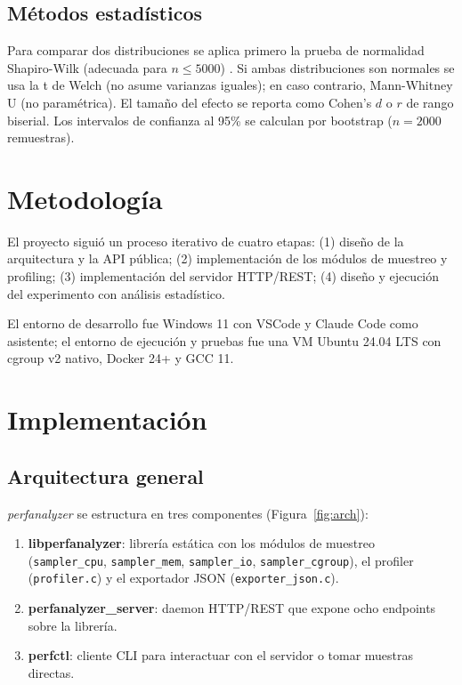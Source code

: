 \documentclass[conference]{IEEEtran}
\begin{document}
\subsection{Métodos estadísticos}

Para comparar dos distribuciones se aplica primero la prueba de normalidad
Shapiro-Wilk (adecuada para $n \leq 5000$) \cite{ieee2024performance}. Si ambas
distribuciones son normales se usa la t de Welch (no asume varianzas iguales);
en caso contrario, Mann-Whitney U (no paramétrica). El tamaño del efecto se
reporta como Cohen's $d$ o $r$ de rango biserial. Los intervalos de confianza
al 95\% se calculan por bootstrap ($n = 2000$ remuestras).

\section{Metodología}

El proyecto siguió un proceso iterativo de cuatro etapas: (1) diseño de la
arquitectura y la API pública; (2) implementación de los módulos de muestreo
y profiling; (3) implementación del servidor HTTP/REST; (4) diseño y ejecución
del experimento con análisis estadístico.

El entorno de desarrollo fue Windows 11 con VSCode y Claude Code como
asistente; el entorno de ejecución y pruebas fue una VM Ubuntu 24.04 LTS
con cgroup v2 nativo, Docker 24+ y GCC 11.

\section{Implementación}

\subsection{Arquitectura general}

\textit{perfanalyzer} se estructura en tres componentes (Figura~\ref{fig:arch}):

\begin{enumerate}
  \item \textbf{libperfanalyzer}: librería estática con los módulos de muestreo
    (\texttt{sampler\_cpu}, \texttt{sampler\_mem}, \texttt{sampler\_io},
    \texttt{sampler\_cgroup}), el profiler (\texttt{profiler.c}) y el exportador
    JSON (\texttt{exporter\_json.c}).
  \item \textbf{perfanalyzer\_server}: daemon HTTP/REST que expone ocho
    endpoints sobre la librería.
  \item \textbf{perfctl}: cliente CLI para interactuar con el servidor o tomar
    muestras directas.
\end{enumerate}
\end{document}
